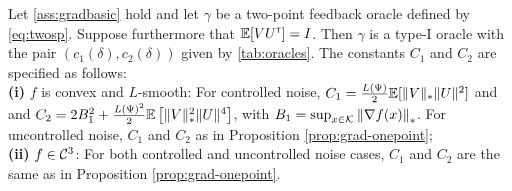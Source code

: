 \begin{proposition}
\label{prop:grad-spsa}
Let \cref{ass:gradbasic} hold and let $\gamma$  be a two-point feedback oracle defined by \eqref{eq:twosp}.
Suppose furthermore that $\mathbb{E}[V U^\mathsf{\scriptscriptstyle T}] = I$.
Then $\gamma$ is a type-I oracle with the pair $(c_1(\delta),c_2(\delta))$ 
given by \cref{tab:oracles}. The constants $C_1$ and $C_2$ are specified as follows:\\
\textbf{(i)} $f$ is convex and $L$-smooth: 
For controlled noise, 
$C_1 = \frac{L(\Psi)}{2} \mathbb{E}[ \|V\|_* \|U\|^2]$ and 
and
$C_2 =  2 B_1^2  + \frac{ L(\Psi)^2}{2}\mathbb{E}\left[ \|V\|_*^2 \|U\|^4 \right]$, with $B_1 = \sup_{x\in \mathcal{K}} \left\|\nabla f(x)\right\|_*$. For uncontrolled noise, $C_1$ and $C_2$ as in Proposition \ref{prop:grad-onepoint}; \\
\textbf{(ii)} $f \in \mathcal{C}^3$: For both controlled and uncontrolled noise cases, $C_1$ and $C_2$ are the same as in Proposition \ref{prop:grad-onepoint}.
\end{proposition}

